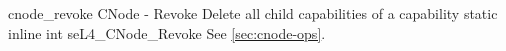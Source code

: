 %
%
%
%

\apidoc
{cnode_revoke}
{CNode - Revoke}
{Delete all child capabilities of a capability}
{static inline int seL4\_CNode\_Revoke}
{
}
{\errorenumdesc}
{See \autoref{sec:cnode-ops}.}


